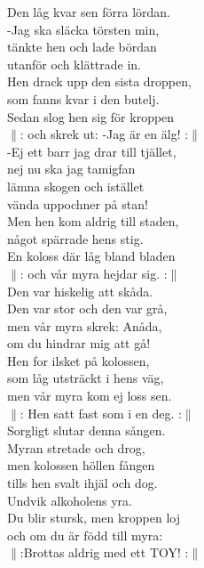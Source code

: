 \documentclass[a6paper,10pt]{article}
\begin{document}
\begin{lyrics}
\newpage
\setlength{\oddsidemargin}{-0.37in}
\noindent
Den låg kvar sen förra lördan.\\ 
-Jag ska släcka törsten min,\\ 
tänkte hen och lade bördan\\ 
utanför och klättrade in.\\ 
Hen drack upp den sista droppen,\\ 
som fanns kvar i den butelj.\\ 
Sedan slog hen sig för kroppen\\
$\|$: och skrek ut: -Jag är en älg! :$\|$
\vspace{5pt}\\  
-Ej ett barr jag drar till tjället,\\ 
nej nu ska jag tamigfan\\ 
lämna skogen och istället\\ 
vända uppochner på stan!\\ 
Men hen kom aldrig till staden,\\ 
något spärrade hens stig.\\ 
En koloss där låg bland bladen\\ 
$\|$: och vår myra hejdar sig. :$\|$
\vspace{5pt}\\  
Den var hiskelig att skåda.\\ 
Den var stor och den var grå,\\ 
men vår myra skrek: Anåda,\\ 
om du hindrar mig att gå!\\ 
Hen for ilsket på kolossen,\\ 
som låg utsträckt i hens väg,\\ 
men vår myra kom ej loss sen.\\ 
$\|$: Hen satt fast som i en deg. :$\|$
\vspace{5pt}\\  
Sorgligt slutar denna sången.\\ 
Myran stretade och drog,\\ 
men kolossen höllen fången\\ 
tills hen svalt ihjäl och dog.\\ 
Undvik alkoholens yra.\\ 
Du blir stursk, men kroppen loj\\ 
och om du är född till myra:\\ 
$\|$:Brottas aldrig med ett TOY! :$\|$ 
\end{lyrics}
\end{document}
